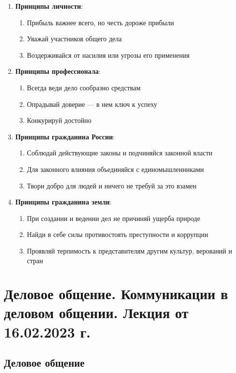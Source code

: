 \begin{enumerate}
    \item \textbf{Принципы личности}:
    \begin{enumerate}
        \item Прибыль важнее всего, но честь дороже прибыли
        \item Уважай участников общего дела
        \item Воздерживайся от насилия или угрозы его применения
    \end{enumerate}
    \item \textbf{Принципы профессионала}:
    \begin{enumerate}
        \item Всегда веди дело сообразно средствам
        \item Опрадывай доверие — в нем ключ к успеху
        \item Конкурируй достойно
    \end{enumerate}
    \item \textbf{Принципы гражданина России}:
    \begin{enumerate}
        \item Соблюдай действующие законы и подчиняйся законной власти
        \item Для законного влияния объединяйся с единомышленниками
        \item Твори добро для людей и ничего не требуй за это взамен
    \end{enumerate}
    \item \textbf{Принципы гражданина земли}:
    \begin{enumerate}
        \item При создании и ведении дел не причиняй ущерба природе
        \item Найди в себе силы противостоять преступности и коррупции
        \item Проявляй терпимость к представителям другим культур, верований и стран
    \end{enumerate}
\end{enumerate}

\section{Деловое общение. Коммуникации в деловом общении. Лекция от 16.02.2023 г.}

\subsection{Деловое общение}

